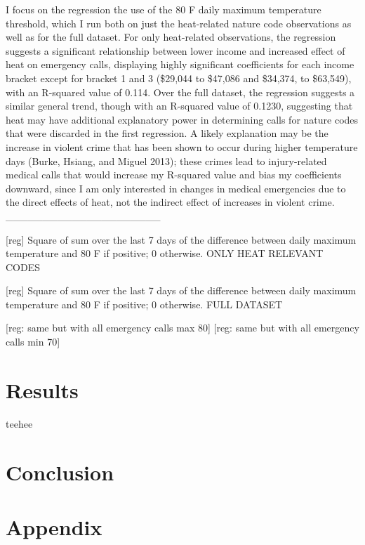 \documentclass[11pt, oneside]{article}      %
\begin{document}
I focus on the regression the use of the 80 F daily maximum temperature threshold, which I run both on just the heat-related nature code observations as well as for the full dataset. For only heat-related observations, the regression suggests a significant relationship between lower income and increased effect of heat on emergency calls, displaying highly significant coefficients for each income bracket except for bracket 1 and 3 (\$29,044 to \$47,086 and \$34,374, to \$63,549), with an R-squared value of 0.114. Over the full dataset, the regression suggests a similar general trend, though with an R-squared value of 0.1230, suggesting that heat may have additional explanatory power in determining calls for nature codes that were discarded in the first regression. A likely explanation may be the increase in violent crime that has been shown to occur during higher temperature days (Burke, Hsiang, and Miguel 2013); these crimes lead to injury-related medical calls that would increase my R-squared value and bias my coefficients downward, since I am only interested in changes in medical emergencies due to the direct effects of heat, not the indirect effect of increases in violent crime. _____________________




[reg]
Square of sum over the last 7 days of the difference between daily maximum temperature and 80 F if positive; 0 otherwise. ONLY HEAT RELEVANT CODES

[reg]
Square of sum over the last 7 days of the difference between daily maximum temperature and 80 F if positive; 0 otherwise. FULL DATASET

[reg: same but with all emergency calls max 80]
[reg: same but with all emergency calls min 70]

\section{Results}
teehee


\section{Conclusion}




\section{Appendix}



\pagebreak
\end{document}
